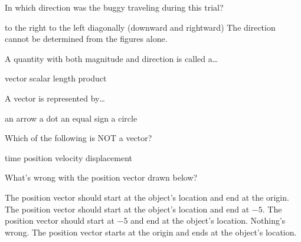 \documentclass[]{exam}
\begin{document}
\begin{questions}
In which direction was the buggy traveling during this trial?

\begin{randomizechoices}[keeplast]
    \choice to the right
    \correctchoice to the left
    \choice diagonally (downward and rightward)
    \choice The direction cannot be determined from the figures alone.
\end{randomizechoices}

\question
A quantity with both magnitude and direction is called a\ldots 

\begin{randomizechoices}
    \correctchoice vector
    \choice scalar
    \choice length
    \choice product
\end{randomizechoices}

\question
A vector is represented by\ldots

\begin{randomizechoices}
    \correctchoice an arrow
    \choice a dot
    \choice an equal sign
    \choice a circle
\end{randomizechoices}

\question
Which of the following is NOT a vector?

\begin{randomizechoices}
    \correctchoice time
    \choice position
    \choice velocity
    \choice displacement
\end{randomizechoices}



\question
What's wrong with the position vector drawn below?

\begin{center}
\end{center}

\begin{randomizechoices}[keeplast]
    \choice The position vector should start at the object's location and end at the origin.
    \choice The position vector should start at the object's location and end at $-5$.
    \choice The position vector should start at $-5$ and end at the object's location.
    \correctchoice Nothing's wrong. The position vector starts at the origin and ends at the object's location.
\end{randomizechoices}


\end{questions}
\end{document}
